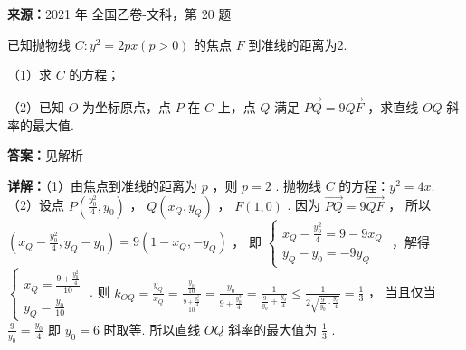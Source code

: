 \begin{question}[points=12]
\textbf{来源：}2021 年 全国乙卷-文科，第 20 题\par
已知抛物线 $C: y^2 = 2px (p>0)$ 的焦点 $F$ 到准线的距离为2.

（1）求 $C$ 的方程；

（2）已知 $O$ 为坐标原点，点 $P$ 在 $C$ 上，点 $Q$ 满足 $\overrightarrow{PQ} = 9\overrightarrow{QF}$ ，求直线 $OQ$ 斜率的最大值.
\begin{solution}
\textbf{答案：}见解析

\textbf{详解：}（1）由焦点到准线的距离为 $p$ ，则 $p = 2$ .
抛物线 $C$ 的方程：$y^2 = 4x$.
（2）设点 $P\left(\frac{y_0^2}{4}, y_0\right)$ ， $Q(x_Q, y_Q)$ ， $F(1,0)$ .
因为 $\overrightarrow{PQ} = 9\overrightarrow{QF}$ ，
所以 $(x_Q - \frac{y_0^2}{4}, y_Q - y_0) = 9(1-x_Q, -y_Q)$ ，
即 $\begin{cases} x_Q - \frac{y_0^2}{4} = 9 - 9x_Q \\ y_Q - y_0 = -9y_Q \end{cases}$ ，解得 $\begin{cases} x_Q = \frac{9 + \frac{y_0^2}{4}}{10} \\ y_Q = \frac{y_0}{10} \end{cases}$ .
则 $k_{OQ} = \frac{y_Q}{x_Q} = \frac{\frac{y_0}{10}}{\frac{9 + \frac{y_0^2}{4}}{10}} = \frac{y_0}{9 + \frac{y_0^2}{4}} = \frac{1}{\frac{9}{y_0} + \frac{y_0}{4}} \le \frac{1}{2\sqrt{\frac{9}{y_0}\cdot\frac{y_0}{4}}} = \frac{1}{3}$ ，
当且仅当 $\frac{9}{y_0} = \frac{y_0}{4}$ 即 $y_0 = 6$ 时取等.
所以直线 $OQ$ 斜率的最大值为 $\frac{1}{3}$ .
\end{solution}
\end{question}

